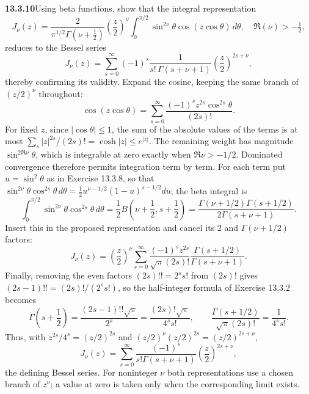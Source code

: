 \par\bigskip
\noindent\textbf{13.3.10}\quad Using beta functions, show that the integral
representation
\[
J_{\nu}(z)=\frac{2}{\pi^{1/2}\Gamma(\nu+\frac{1}{2})}
\left(\frac{z}{2}\right)^{\nu}
\int_{0}^{\pi/2}\sin^{2\nu}\theta\cos(z\cos\theta)\,d\theta,
\quad\Re(\nu)>-\tfrac{1}{2},
\]
reduces to the Bessel series
\[
J_{\nu}(z)=\sum_{s=0}^{\infty}(-1)^{s}
\frac{1}{s!\,\Gamma(s+\nu+1)}\left(\frac{z}{2}\right)^{2s+\nu},
\]
thereby confirming its validity.
\solution
Expand the cosine, keeping the same branch of $(z/2)^\nu$
throughout:
\[
\cos(z\cos\theta)=\sum_{s=0}^{\infty}
\frac{(-1)^s z^{2s}\cos^{2s}\theta}{(2s)!}.
\]
For fixed $z$, since $|\cos\theta|\le1$, the sum of the absolute
values of the terms is at most
$\sum_s|z|^{2s}/(2s)!=\cosh|z|\le e^{|z|}$.
The remaining weight has magnitude $\sin^{2\Re\nu}\theta$,
which is integrable at zero exactly when $\Re\nu>-1/2$.
Dominated convergence therefore permits integration term by term.
For each term put $u=\sin^2\theta$ as in Exercise 13.3.8, so that
$\sin^{2\nu}\theta\cos^{2s}\theta\,d\theta
=\frac12u^{\nu-1/2}(1-u)^{s-1/2}du$; the beta integral is
\[
\int_0^{\pi/2}\sin^{2\nu}\theta\cos^{2s}\theta\,d\theta
=\frac12B\left(\nu+\frac12,s+\frac12\right)
=\frac{\Gamma(\nu+1/2)\Gamma(s+1/2)}{2\Gamma(s+\nu+1)}.
\]
Insert this in the proposed representation and cancel its
$2$ and $\Gamma(\nu+1/2)$ factors:
\[
J_\nu(z)=\left(\frac z2\right)^\nu
\sum_{s=0}^{\infty}\frac{(-1)^sz^{2s}}{\sqrt\pi(2s)!}
\frac{\Gamma(s+1/2)}{\Gamma(s+\nu+1)}.
\]
Finally, removing the even factors $(2s)!!=2^ss!$ from $(2s)!$
gives $(2s-1)!!=(2s)!/(2^ss!)$, so the half-integer formula of
Exercise 13.3.2 becomes
\[
\Gamma\left(s+\frac12\right)
=\frac{(2s-1)!!\sqrt\pi}{2^s}
=\frac{(2s)!\sqrt\pi}{4^ss!},
\qquad
\frac{\Gamma(s+1/2)}{\sqrt\pi(2s)!}=\frac1{4^ss!}.
\]
Thus, with $z^{2s}/4^s=(z/2)^{2s}$ and
$(z/2)^\nu(z/2)^{2s}=(z/2)^{2s+\nu}$,
\[
\boxed{J_\nu(z)=\sum_{s=0}^{\infty}
\frac{(-1)^s}{s!\Gamma(s+\nu+1)}
\left(\frac z2\right)^{2s+\nu}},
\]
the defining Bessel series.  For noninteger $\nu$ both
representations use a chosen branch of $z^\nu$; a value at zero
is taken only when the corresponding limit exists.


